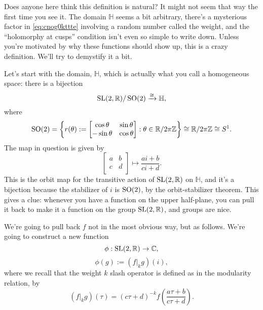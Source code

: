 \documentclass[reqno]{amsart} 
\begin{document}
Does anyone here think this definition is natural?  It might not seem that way the first time you see it.  The domain $\mathbb{H}$ seems a bit arbitrary, there's a mysterious factor in \eqref{eq:cnog0kttte} involving a random number called the weight, and the ``holomorphy at cusps'' condition isn't even so simple to write down.  Unless you're motivated by why these functions should show up, this is a crazy definition.  We'll try to demystify it a bit.

Let's start with the domain, $\mathbb{H}$, which is actually what you call a homogeneous space: there is a bijection
\begin{equation*}
  \operatorname{SL}(2,\mathbb{R}) / \operatorname{SO}(2) \xrightarrow{\cong} \mathbb{H},
\end{equation*}
where
\begin{equation*}
  \operatorname{SO}(2) = \left\{
    {
      r(\theta)
    }
    :=
    \begin{bmatrix}
      \cos \theta      &  \sin \theta \\
      - \sin \theta                       & \cos \theta \\
    \end{bmatrix} : \theta \in \mathbb{R} / 2 \pi \mathbb{Z} \right\}
  \cong \mathbb{R} / 2 \pi \mathbb{Z} \cong S^1.
\end{equation*}
The map in question is given by
\begin{equation*}
  \begin{bmatrix}
    a    & b \\
    c & d \\
  \end{bmatrix}
  \mapsto \frac{a i + b}{c i + d}.  
\end{equation*}
This is the orbit map for the transitive action of $\operatorname{SL}(2,\mathbb{R})$ on $\mathbb{H}$, and it's a bijection because the stabilizer of $i$ is $\operatorname{SO}(2)$, by the orbit-stabilizer theorem.  This gives a clue: whenever you have a function on the upper half-plane, you can pull it back to make it a function on the group $\operatorname{SL}(2,\mathbb{R})$, and groups are nice.

We're going to pull back $f$ not in the most obvious way, but as follows.  We're going to construct a new function
\begin{equation*}
  \phi : \operatorname{SL}(2,\mathbb{R}) \rightarrow \mathbb{C},
\end{equation*}
\begin{equation*}
  \phi(g) :=  (f|_k g)(i),
\end{equation*}
where we recall that the weight $k$ slash operator is defined as in the modularity relation, by
\begin{equation*}
  (f |_k g)(\tau) =(c \tau + d)^{- k} f \left( \frac{a \tau + b}{c \tau + d} \right).
\end{equation*}
\end{document}

